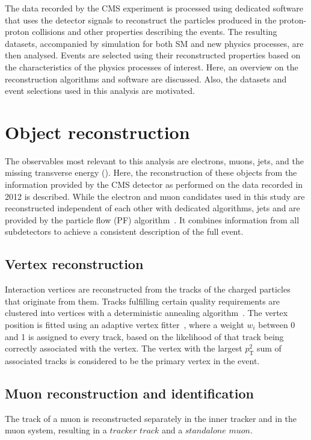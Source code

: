 \label{sec:ana}
The data recorded by the CMS experiment is processed using dedicated software that uses the detector signals to reconstruct the particles produced in the proton-proton collisions and other properties describing the events. The resulting datasets, accompanied by simulation for both SM and new physics processes, are then analysed. Events are selected using their reconstructed properties based on the characteristics of the physics processes of interest. Here, an overview on the reconstruction algorithms and software are discussed. Also, the datasets and event selections used in this analysis are motivated.
\section{Object reconstruction}
The observables most relevant to this analysis are electrons, muons, jets, and the missing transverse energy (\MET). Here, the reconstruction of these objects from the information provided by the CMS detector as performed on the data recorded in 2012 is described. While the electron and muon candidates used in this study are reconstructed independent of each other with dedicated algorithms, jets and \MET are provided by the particle flow (PF) algorithm~\cite{CMS-PAS-PFT-09-001}. It combines information from all subdetectors to achieve a consistent description of the full event. 

\subsection{Vertex reconstruction}
Interaction vertices are reconstructed from the tracks of the charged particles that originate from them.
Tracks fulfilling certain quality requirements are clustered into vertices with a deterministic annealing algorithm~\cite{DertermisiticAnnealing,Chatrchyan:2014fea}. The vertex position is fitted using an adaptive vertex fitter~\cite{Fruehwirth:1027031}, where a weight $w_i$ between 0 and 1 is assigned to every track, based on the likelihood of that track being correctly associated with the vertex. The vertex with the largest $p_\mathrm{T}^2$ sum of associated tracks is considered to be the primary vertex in the event.

\subsection{Muon reconstruction and identification}
The track of a muon is reconstructed separately in the inner tracker and in the muon system, resulting in a $\textit{tracker track}$ and a $\textit{standalone muon}$. 

